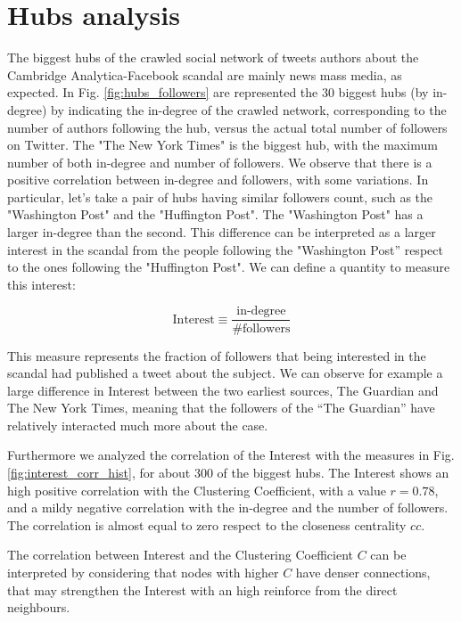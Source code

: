 \documentclass[11pt, twoside]{report}
\begin{document}
\clearpage
\section{Hubs analysis}

The biggest hubs of the crawled social network of tweets authors about the Cambridge Analytica-Facebook scandal are mainly
news mass media, as expected. In Fig. \ref{fig:hubs_followers} are represented the 30 biggest hubs (by in-degree) by indicating
the in-degree of the crawled network, corresponding to the number of authors following the hub, versus the actual total
number of followers on Twitter.
The "The New York Times" is the biggest hub, with the maximum number of both in-degree and number of followers.
We observe that there is a positive correlation between in-degree and followers, with some variations.
In particular, let's take a pair of hubs having similar followers count, such as the "Washington Post" and the "Huffington Post".
The "Washington Post" has a larger in-degree than the second.
This difference can be interpreted as a larger interest in the scandal from the people following the "Washington Post'' respect 
to the ones following the "Huffington Post".
We can define a quantity to measure this interest:

\begin{equation}
  \text{Interest} \equiv \frac{ \text{in-degree} }{\text{\#followers}}
  \label{eq:interest}
\end{equation}

This measure represents the fraction of followers that being interested in the scandal had published a tweet about the subject.
We can observe for example a large difference in Interest between the two earliest sources, The Guardian and The New York Times,
meaning that the followers of the ``The Guardian'' have relatively interacted much more about the case.

Furthermore we analyzed the correlation of the Interest with the measures in Fig. \ref{fig:interest_corr_hist}, for about 300 of the biggest hubs.
The Interest shows an high positive correlation with the Clustering Coefficient, with a value $r=0.78$, and a mildy negative correlation with the in-degree and the number of followers. The correlation is almost equal to zero respect to the closeness centrality $cc$.

The correlation between Interest and the Clustering Coefficient $C$ can be interpreted
by considering that nodes with higher $C$ have denser connections, that may strengthen the Interest with an high reinforce from the
direct neighbours.
\end{document}
